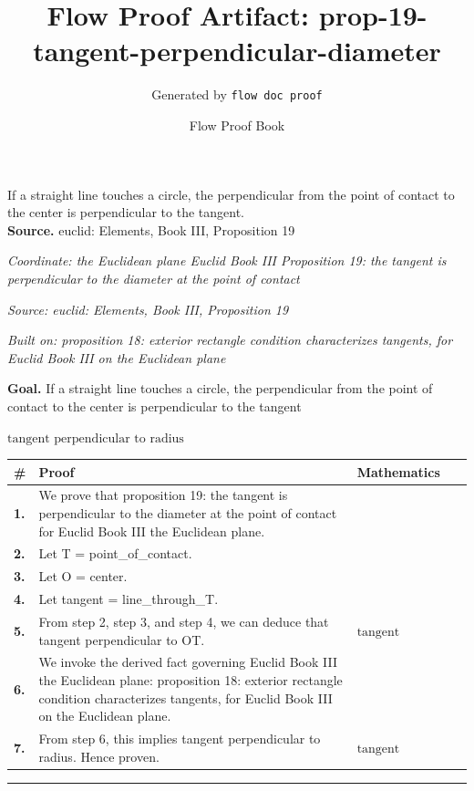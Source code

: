 \documentclass[11pt]{article}
\title{Flow Proof Artifact: prop-19-tangent-perpendicular-diameter}
\author{Generated by \texttt{flow doc proof}}
\date{Flow Proof Book}
\theoremstyle{definition}
\begin{document}
\maketitle
If a straight line touches a circle, the perpendicular from the point of contact to the center is perpendicular to the tangent.\\[0.5em]
\textbf{Source.} euclid: Elements, Book III, Proposition 19\\[0.5em]
\bigskip
{}\par
\smallskip\noindent\textit{Coordinate: the Euclidean plane \cdot Euclid Book III \cdot Proposition 19: the tangent is perpendicular to the diameter at the point of contact}\par
\smallskip\noindent\textit{Source: euclid: Elements, Book III, Proposition 19}\par
\smallskip\noindent\textit{Built on: proposition 18: exterior rectangle condition characterizes tangents, for Euclid Book III on the Euclidean plane}\par
\medskip
\noindent\textbf{Goal.} If a straight line touches a circle, the perpendicular from the point of contact to the center is perpendicular to the tangent\par
\noindent$\displaystyle \text{tangent perpendicular to radius}$\par
\medskip
\noindent
\begin{tabular}{@{} >{\raggedright\arraybackslash}p{} >{\raggedright\arraybackslash}p{} >{\raggedleft\arraybackslash}p{} @{}}
\textbf{\#} & \textbf{Proof} & \textbf{Mathematics} \\
\midrule
\textbf{1.} & We prove that proposition 19: the tangent is perpendicular to the diameter at the point of contact for Euclid Book III the Euclidean plane. & \\[0.45em]
\textbf{2.} & Let T = point\_of\_contact. & \\[0.45em]
\textbf{3.} & Let O = center. & \\[0.45em]
\textbf{4.} & Let tangent = line\_through\_T. & \\[0.45em]
\textbf{5.} & From step 2, step 3, and step 4, we can deduce that tangent perpendicular to OT. & $\displaystyle \text{tangent perpendicular to OT}$ \\[0.45em]
\textbf{6.} & We invoke the derived fact governing Euclid Book III the Euclidean plane: proposition 18: exterior rectangle condition characterizes tangents, for Euclid Book III on the Euclidean plane. & \\[0.45em]
\textbf{7.} & From step 6, this implies tangent perpendicular to radius. Hence proven. & $\displaystyle \text{tangent perpendicular to radius}$ \\[0.45em]
\bottomrule
\end{tabular}
\label{thm:Geometry-Euclid Book III-proposition_19_the_tangent_is_perpendicular_to_the_diameter_at_the_point_of_contact}
\par\medskip\hrule
\end{document}
